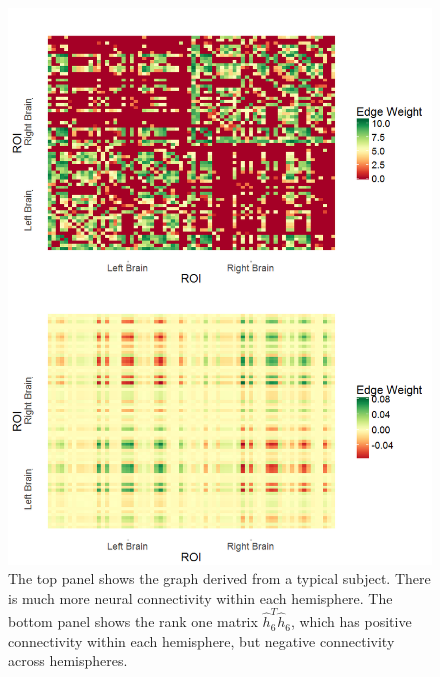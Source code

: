 \documentclass[simplex.tex]{subfiles}
\begin{document}
\begin{figure}[!h]
\begin{cframed}
\centering
\includegraphics[scale=0.25]{../../figs/cci_data.png}
\caption{The top panel shows the graph derived from a typical subject. There is much more neural connectivity within each hemisphere. The bottom panel shows the rank one matrix $\hat{h}_6^T\hat{h}_6$, which has positive  connectivity within each hemisphere, but negative  connectivity across hemispheres.}
\label{fig:cci1}
\end{cframed}
\end{figure}
%
\end{document}
